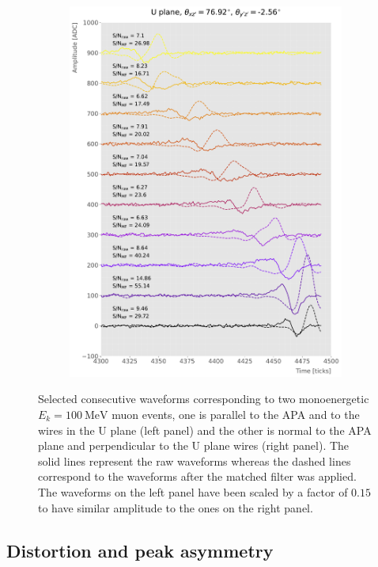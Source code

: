 \begin{figure}[t]
\begin{subfigure}{0.5\textwidth}
		\includegraphics[width=.99\linewidth]{Images/Matched_Filter/evt_xz_90_yz_0_U}
	\end{subfigure}
	\caption[Waveforms for two muon events, one parallel to the APA and to the wires in the U plane and other normal to the APA plane and perpendicular to the U plane wires.]{Selected consecutive waveforms corresponding to two monoenergetic $E_{k} = 100 \ \mathrm{MeV}$ muon events, one is parallel to the APA and to the wires in the U plane (left panel) and the other is normal to the APA plane and perpendicular to the U plane wires (right panel). The solid lines represent the raw waveforms whereas the dashed lines correspond to the waveforms after the matched filter was applied. The waveforms on the left panel have been scaled by a factor of $0.15$ to have similar amplitude to the ones on the right panel.}
	\label{fig:example_orientation}
\end{figure}

\subsection{Distortion and peak asymmetry}
\label{sec:A.5}

